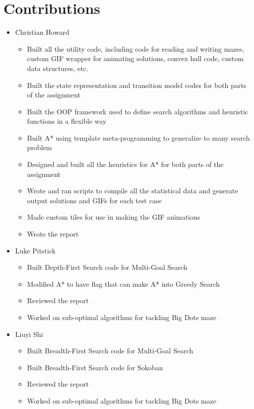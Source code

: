 \documentclass{article}[12pt]
\begin{document}
\section{Contributions}
\begin{itemize}
\item Christian Howard
	\begin{itemize}
	\item Built all the utility code, including code for reading and writing mazes, custom GIF wrapper for animating solutions, convex hull code, custom data structures, etc.
	\item Built the state representation and transition model codes for both parts of the assignment
	\item Built the OOP framework used to define search algorithms and heuristic functions in a flexible way
	\item Built A* using template meta-programming to generalize to many search problem
	\item Designed and built all the heuristics for A* for both parts of the assignment
	\item Wrote and ran scripts to compile all the statistical data and generate output solutions and GIFs for each test case
	\item Made custom tiles for use in making the GIF animations
	\item Wrote the report
	\end{itemize}
\item Luke Pitstick
	\begin{itemize}
	\item Built Depth-First Search code for Multi-Goal Search
	\item Modified A* to have flag that can make A* into Greedy Search
	\item Reviewed the report
	\item Worked on sub-optimal algorithms for tackling Big Dots maze
	\end{itemize}
\item Liuyi Shi
	\begin{itemize}
	\item Built Breadth-First Search code for Multi-Goal Search
	\item Built Breadth-First Search code for Sokoban
	\item Reviewed the report
	\item Worked on sub-optimal algorithms for tackling Big Dots maze
	\end{itemize}
\end{itemize}   
   
\end{document}
